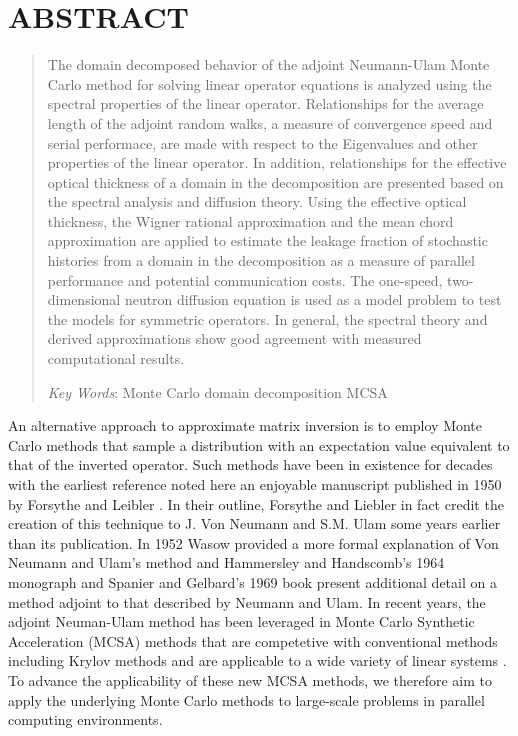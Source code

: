 \documentclass{mc2013}
\begin{document}
\section*{ABSTRACT} 
\begin{quote}
\begin{small}
The domain decomposed behavior of the adjoint Neumann-Ulam Monte Carlo
method for solving linear operator equations is analyzed using the
spectral properties of the linear operator. Relationships for the
average length of the adjoint random walks, a measure of convergence
speed and serial performace, are made with respect to the Eigenvalues
and other properties of the linear operator. In addition,
relationships for the effective optical thickness of a domain in the
decomposition are presented based on the spectral analysis and
diffusion theory. Using the effective optical thickness, the Wigner
rational approximation and the mean chord approximation are applied to
estimate the leakage fraction of stochastic histories from a domain in
the decomposition as a measure of parallel performance and potential
communication costs. The one-speed, two-dimensional neutron diffusion
equation is used as a model problem to test the models for symmetric
operators. In general, the spectral theory and derived approximations
show good agreement with measured computational results.

\emph{Key Words}: Monte Carlo domain decomposition MCSA
\end{small} 
\end{quote}

\setlength{\baselineskip}{14pt}
\normalsize

\label{sec:intro}

An alternative approach to approximate matrix inversion is to employ
Monte Carlo methods that sample a distribution with an expectation
value equivalent to that of the inverted operator. Such methods have
been in existence for decades with the earliest reference noted here
an enjoyable manuscript published in 1950 by Forsythe and Leibler
\cite{forsythe_matrix_1950}. In their outline, Forsythe and Liebler in
fact credit the creation of this technique to J. Von Neumann and
S.M. Ulam some years earlier than its publication. In 1952 Wasow
provided a more formal explanation of Von Neumann and Ulam's method
\cite{wasow_note_1952} and Hammersley and Handscomb's 1964 monograph
\cite{hammersley_monte_1964} and Spanier and Gelbard's 1969 book
\cite{spanier_monte_1969} present additional detail on a method
adjoint to that described by Neumann and Ulam. In recent years, the
adjoint Neuman-Ulam method has been leveraged in Monte Carlo Synthetic
Acceleration (MCSA) methods that are competetive with conventional
methods including Krylov methods and are applicable to a wide variety
of linear systems \cite{evans_monte_2009,evans_monte_2012}. To advance
the applicability of these new MCSA methods, we therefore aim to apply
the underlying Monte Carlo methods to large-scale problems in parallel
computing environments.
\end{document}
